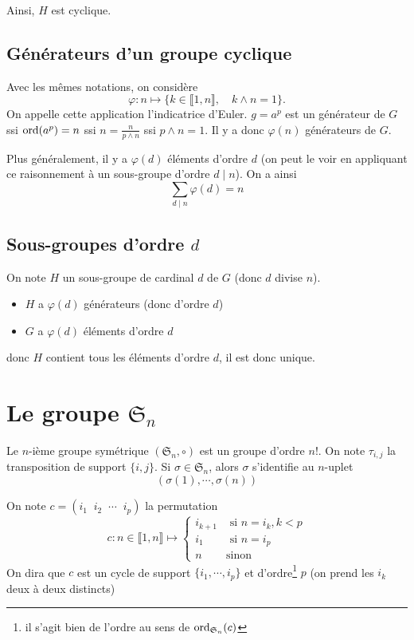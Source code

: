 Ainsi, $H$ est cyclique.

\subsection{Générateurs d'un groupe cyclique}

Avec les mêmes notations, on considère \[
    \varphi: n\longmapsto \{k\in\llbracket 1, n\rrbracket, \quad k\land n=1\}.
\]
On appelle cette application l'indicatrice d'Euler.
$g=a^p$ est un générateur de $G$ ssi $\mathrm{ord}(a^p)=n$ ssi $n=\frac{n}{p\land n}$ ssi $p\land n=1$. Il y a donc $\varphi(n)$ générateurs de $G$.

Plus généralement, il y a $\varphi(d)$ éléments d'ordre $d$ (on peut le voir en appliquant ce raisonnement à un sous-groupe d'ordre $d\;|\; n$). On a ainsi \[
    \sum_{d\;|\; n}\varphi(d)=n
\]

\subsection{Sous-groupes d'ordre $d$}

On note $H$ un sous-groupe de cardinal $d$ de $G$ (donc $d$ divise $n$).
\begin{itemize}
    \item $H$ a $\varphi(d)$ générateurs (donc d'ordre $d$)
    \item $G$ a $\varphi(d)$ éléments d'ordre $d$
\end{itemize}
donc $H$ contient tous les éléments d'ordre $d$, il est donc unique.

\section{Le groupe \texorpdfstring{$\mathfrak S_n$}{symétrique d'ordre n}}

Le $n$-ième groupe symétrique $(\mathfrak S_n, \circ)$ est un groupe d'ordre $n!$. On note $\tau_{i, j}$ la transposition de support $\{i, j\}$. Si $\sigma \in \mathfrak S_n$, alors $\sigma$ s'identifie au $n$-uplet \[
    (\sigma(1), \cdots, \sigma(n))
\]

On note $c=(i_1\;\;i_2\;\;\cdots \;\;i_p)$ la permutation \[ 
    c: n \in\llbracket 1, n\rrbracket \longmapsto \begin{cases}
        i_{k+1}& \text{ si }n=i_k, k<p\\
        i_1 &\text{ si }n=i_p\\
        n & \text{sinon}
    \end{cases}
\] 
On dira que $c$ est un cycle de support $\{i_1, \cdots, i_p\}$ et d'ordre\footnote{il s'agit bien de l'ordre au sens de $\mathrm{ord}_{\mathfrak S_n}(c)$} $p$ (on prend les $i_k$ deux à deux distincts)

